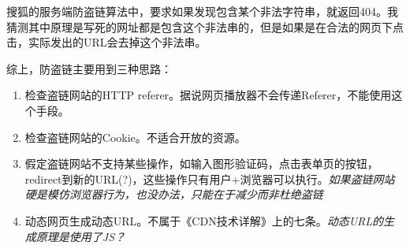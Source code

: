 搜狐的服务端防盗链算法中，要求如果发现包含某个非法字符串，就返回404。我猜测其中原理是写死的网址都是包含这个非法串的，但是如果是在合法的网页下点击，实际发出的URL会去掉这个非法串。


综上，防盗链主要用到三种思路：
\begin{enumerate}
\item 检查盗链网站的HTTP referer。据说网页播放器不会传递Referer，不能使用这个手段。
\item 检查盗链网站的Cookie。不适合开放的资源。
\item 假定盗链网站不支持某些操作，如输入图形验证码，点击表单页的按钮，redirect到新的URL(?)，这些操作只有用户+浏览器可以执行。\textit{如果盗链网站硬是模仿浏览器行为，也没办法，只能在于减少而非杜绝盗链}
\item 动态网页生成动态URL。不属于《CDN技术详解》上的七条。\textit{动态URL的生成原理是使用了JS？}
\end{enumerate}


